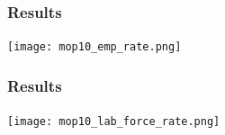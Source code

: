 \begin{frame}

    \label{emp_rate_result}
    \frametitle{Results} %
    \framesubtitle{}  %
    \rmfamily %
    
    \begin{center}
        \texttt{[image: mop10\_emp\_rate.png]}
    \end{center}

    \hyperlink{perc_comparison_2}{}
    \hyperlink{ta_2}{}

\end{frame}

\begin{frame}

    \label{lab_force_rate_result}
    \frametitle{Results} %
    \framesubtitle{}  %
    \rmfamily %
    
    \begin{center}
        \texttt{[image: mop10\_lab\_force\_rate.png]}
    \end{center}

    \hyperlink{perc_comparison_3}{}
    \hyperlink{ta_3}{}

\end{frame}


\begin{comment}

\begin{frame}

    \frametitle{What is to be done?} %
    \framesubtitle{}  %
    \rmfamily %
    
    \begin{wideitemize}
        \item Minimum wage measures of bindingness
        \vspace{9pt}
        \begin{wideitemize}
            \item Idea: we can estimate the effect of minimum wage on employment for wage bins
            \item Then assign, if significant, the coefficient to each county
            \item Sector compositions of the counties can also be relevant
        \end{wideitemize}
        \item I'm \textcolor{fblu}{open to suggestions}
        \item Participation rates might capture some of the effect
        \item Distribution of individual effects
    \end{wideitemize}
    
\end{frame}

\end{comment}



